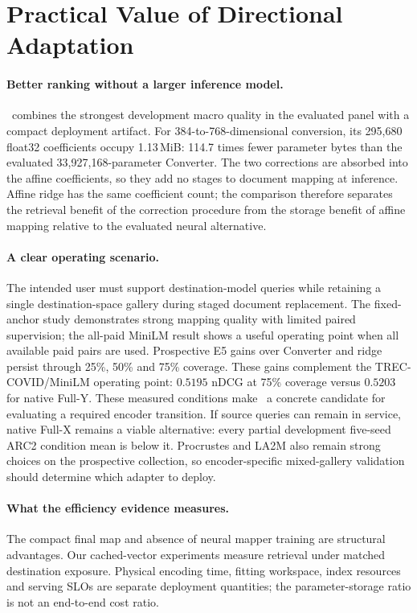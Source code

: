 \section{Practical Value of Directional Adaptation}
\label{sec:discussion}
\paragraph{Better ranking without a larger inference model.}
\method\ combines the strongest development macro quality in the evaluated
panel with a compact deployment artifact. For 384-to-768-dimensional
conversion, its 295,680 float32 coefficients occupy 1.13\,MiB: 114.7 times
fewer parameter bytes than the evaluated 33,927,168-parameter Converter.
The two corrections are absorbed into the affine coefficients, so they add
no stages to document mapping at inference. Affine ridge has the same
coefficient count; the comparison therefore separates the retrieval
benefit of the correction procedure from the storage benefit of affine
mapping relative to the evaluated neural alternative.

\paragraph{A clear operating scenario.}
The intended user must support destination-model queries while retaining
a single destination-space gallery during staged document replacement.
The fixed-anchor study demonstrates strong mapping quality with limited
paired supervision; the all-paid MiniLM result shows a useful operating
point when all available paid pairs are used. Prospective E5 gains over
Converter and ridge persist through 25\%, 50\% and 75\% coverage. These
gains complement the TREC-COVID/MiniLM operating point: $0.5195$ nDCG at
75\% coverage versus $0.5203$ for native Full-Y. These measured conditions
make \method\ a concrete candidate for evaluating a required
encoder transition. If source queries can remain in service, native
Full-X remains a viable alternative: every partial development five-seed
ARC2 condition mean is below it. Procrustes and LA2M also remain strong choices on
the prospective collection, so encoder-specific mixed-gallery validation
should determine which adapter to deploy.

\paragraph{What the efficiency evidence measures.}
The compact final map and absence of neural mapper training are structural
advantages. Our cached-vector experiments measure retrieval under matched
destination exposure. Physical encoding time, fitting workspace, index
resources and serving SLOs are separate deployment quantities; the
parameter-storage ratio is not an end-to-end cost ratio.
